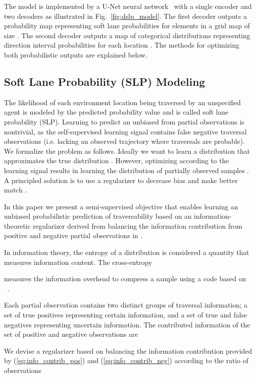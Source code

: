 \documentclass[letterpaper, 10 pt, conference]{ieeeconf}
\begin{document}
The model is implemented by a U-Net neural network~\cite{ronneberger2015unet} with a single encoder and two decoders as illustrated in Fig.~\ref{fig:dslp_model}. The first decoder outputs a probability map  representing soft lane probabilities for elements in a grid map of size . The second decoder outputs a map of categorical distributions  representing  direction interval probabilities for each location . The methods for optimizing both probabilistic outputs are explained below.

\subsection{Soft Lane Probability (SLP) Modeling}

The likelihood of each environment location  being traversed by an unspecified agent is modeled by the predicted probability value  and is called soft lane probability (SLP). Learning to predict an unbiased  from partial observations is nontrivial, as the self-supervised learning signal contains false negative traversal observations (i.e. lacking an observed trajectory where traversals are probable). We formalize the problem as follows. Ideally we want to learn a distribution  that approximates the true distribution . However, optimizing  according to the learning signal results in learning the distribution of partially observed samples . A principled solution is to use a regularizer to decrease bias and make  better match .

In this paper we present a semi-supervised objective that enables learning an unbiased probabilistic prediction of traversability based on an information-theoretic regularizer derived from balancing the information contribution from positive and negative partial observations in .

In information theory, the entropy  of a distribution  is considered a quantity that measures information content. The cross-entropy

\noindent measures the information overhead to compress a sample  using a code based on ~\cite{murphy2022pml1}.

Each partial observation  contains two distinct groups of traversal information; a set of true positives representing certain information, and a set of true and false negatives representing uncertain information. The contributed information of the set of positive and negative observations are


\noindent We devise a regularizer based on balancing the information contribution provided by (\ref{eq:info_contrib_pos}) and (\ref{eq:info_contrib_neg}) according to the ratio of observations
\end{document}
